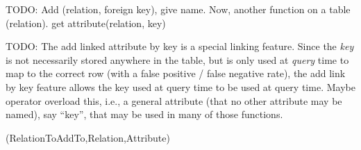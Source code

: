 \documentclass[ ../main.tex]{subfiles}
\begin{document}
TODO: Add (relation, foreign key), give name. Now, another function on a table (relation). get attribute(relation, key)

TODO: The add linked attribute by key is a special linking feature. Since the \emph{key} is not necessarily stored anywhere in the table, but is only used at \emph{query} time to map to the correct row (with a false positive / false negative rate), the add link by key feature allows the key used at query time to be used at query time. Maybe operator overload this, i.e., a general attribute (that no other attribute may be named), say ``key'', that may be used in many of those functions.

\AddLinkByKey(RelationToAddTo,Relation,Attribute)
\end{document}
